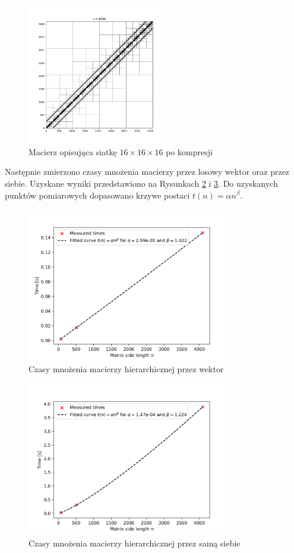 \documentclass{../myclass}
\begin{document}
\begin{figure}[h!]
    \centering
    \includegraphics[width=0.55\textwidth]{2_bp_hm.png}
    \caption{Macierz opisująca siatkę \(16\times16\times16\) po kompresji}
    \label{fig:3}
\end{figure}
\newpage
Następnie zmierzono czasy mnożenia macierzy przez losowy wektor oraz przez siebie. Uzyskane wyniki
przedstawiono na Rysunkach \ref{fig:4} i \ref{fig:5}. Do uzyskanych punktów pomiarowych dopasowano
krzywe postaci \(t(n) = \alpha n^\beta\).

\begin{figure}[ht]
    \centering
    \includegraphics[width=0.8\textwidth]{mvtimes.png}
    \caption{Czasy mnożenia macierzy hierarchicznej przez wektor}
    \label{fig:4}
\end{figure}

\begin{figure}[ht]
    \centering
    \includegraphics[width=0.8\textwidth]{mmtimes.png}
    \caption{Czasy mnożenia macierzy hierarchicznej przez samą siebie}
    \label{fig:5}
\end{figure}
\end{document}
